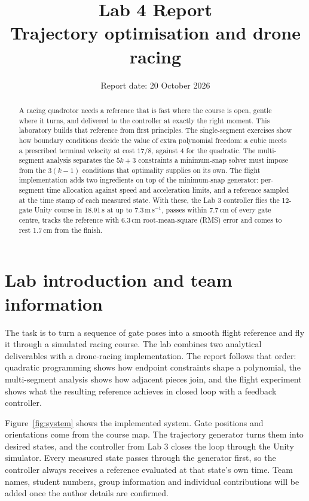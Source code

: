 \documentclass[12pt,a4paper,twoside]{article}
\title{Lab 4 Report\\[0.3em]\large Trajectory optimisation and drone racing}
\author{\studentname}
\date{Report date: 20 October 2026}
\renewcommand{\abstractname}{Summary}
\begin{document}
\raggedbottom
\renewcommand{\abstractname}{Summary}
\maketitle
\begin{abstract}
A racing quadrotor needs a reference that is fast where the course is open,
gentle where it turns, and delivered to the controller at exactly the right
moment. This laboratory builds that reference from first principles. The
single-segment exercises show how boundary conditions decide the value of extra
polynomial freedom: a cubic meets a prescribed terminal velocity at cost $17/8$,
against 4 for the quadratic. The multi-segment analysis separates the $5k+3$
constraints a minimum-snap solver must impose from the $3(k-1)$ conditions that
optimality supplies on its own. The flight implementation adds two ingredients
on top of the minimum-snap generator: per-segment time allocation against
speed and acceleration limits, and a reference sampled at the time stamp of each
measured state. With these, the Lab 3 controller flies the 12-gate Unity course
in 18.91\,s at up to 7.3\,m\,s$^{-1}$, passes within 7.7\,cm of every gate centre,
tracks the reference with 6.3\,cm root-mean-square (RMS) error and comes to rest
1.7\,cm from the finish.
\end{abstract}

\section{Lab introduction and team information}
The task is to turn a sequence of gate poses into a smooth flight reference and
fly it through a simulated racing course. The lab combines two analytical
deliverables with a drone-racing implementation\cite{lab4}. The report follows
that order: quadratic programming shows how endpoint constraints shape a
polynomial, the multi-segment analysis shows how adjacent pieces join, and the
flight experiment shows what the resulting reference achieves in closed loop
with a feedback controller.

Figure~\ref{fig:system} shows the implemented system. Gate positions and
orientations come from the course map. The trajectory generator turns them into
desired states, and the controller from Lab 3 closes the loop through the Unity
simulator. Every measured state passes through the generator first, so the
controller always receives a reference evaluated at that state's own time. Team
names, student numbers, group information and individual contributions will be
added once the author details are confirmed.
\end{document}
